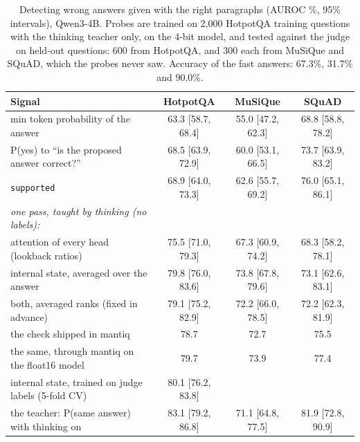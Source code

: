 \documentclass[11pt]{article}
\begin{document}
\begin{table}[t]
\centering
\small
\caption{Detecting wrong answers given with the right paragraphs (AUROC \%, 95\% intervals), Qwen3-4B. Probes are trained on 2{,}000 HotpotQA training questions with the thinking teacher only, on the 4-bit model, and tested against the judge on held-out questions: 600 from HotpotQA, and 300 each from MuSiQue and SQuAD, which the probes never saw. Accuracy of the fast answers: 67.3\%, 31.7\% and 90.0\%.}
\label{tab:wrong}
\setlength{\tabcolsep}{4pt}
\begin{tabular}{lccc}
\toprule
Signal & HotpotQA & MuSiQue & SQuAD \\
\midrule
min token probability of the answer & 63.3 [58.7, 68.4] & 55.0 [47.2, 62.3] & 68.8 [58.8, 78.2] \\
P(yes) to ``is the proposed answer correct?'' & 68.5 [63.9, 72.9] & 60.0 [53.1, 66.5] & 73.7 [63.9, 83.2] \\
\texttt{supported} & 68.9 [64.0, 73.3] & 62.6 [55.7, 69.2] & 76.0 [65.1, 86.1] \\
\midrule
\emph{one pass, taught by thinking (no labels):} & & & \\
\quad attention of every head (lookback ratios) & 75.5 [71.0, 79.3] & 67.3 [60.9, 74.2] & 68.3 [58.2, 78.1] \\
\quad internal state, averaged over the answer & 79.8 [76.0, 83.6] & 73.8 [67.8, 79.6] & 73.1 [62.6, 83.1] \\
\quad both, averaged ranks (fixed in advance) & 79.1 [75.2, 82.9] & 72.2 [66.0, 78.5] & 72.2 [62.3, 81.9] \\
\quad the check shipped in mantiq & 78.7 & 72.7 & 75.5 \\
\quad the same, through mantiq on the float16 model & 79.7 & 73.9 & 77.4 \\
\midrule
internal state, trained on judge labels (5-fold CV) & 80.1 [76.2, 83.8] & & \\
the teacher: P(same answer) with thinking on & 83.1 [79.2, 86.8] & 71.1 [64.8, 77.5] & 81.9 [72.8, 90.9] \\
\bottomrule
\end{tabular}
\end{table}
\end{document}
